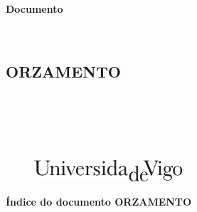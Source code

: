 \documentclass[11pt,twoside]{book}
\begin{document}
\begin{center}
\begin{normalsize}
\begin{center}
\textbf{\grado}
\end{center}
\end{normalsize}
\ \\
\ \\
\ \\
\ \\
\begin{normalsize}
\begin{center}
\textbf{Documento}
\end{center}
\end{normalsize}
\ \\
\begin{normalsize}
\begin{center}
\part{\bf{ORZAMENTO}}
\end{center}
\end{normalsize}
\ \\
\ \\
\ \\
\ \\

\begin{center}
\begin{figure}[htbp]
\begin{center}
\includegraphics[angle=0, height=0.8cm]{images/UVIGOLogo.png}
\end{center}
\end{figure}
\end{center}

\end{center}

\cleardoublepage


\pagestyle{fancy}
\startcontents[parts]
\begin{center}{\large \bf Índice do documento ORZAMENTO}\end{center}
\end{document}
